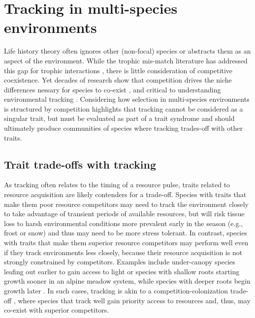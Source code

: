 \documentclass[11pt,letterpaper]{article}
\begin{document}
\section{Tracking in multi-species environments} 
Life history theory often ignores other (non-focal) species or abstracts them as an aspect of the environment. While the trophic mis-match literature has addressed this gap for trophic interactions \citep{Visser:2005bg,vissergienapp2019}, there is little consideration of competitive coexistence. Yet decades of research show that competition drives the niche differences nessary for species to co-exist \citep{Hutchinson:1959xi,Chesson:2000vd}, and critical to understanding environmental tracking \citep{metcalf2015}. Considering how selection in multi-species environments is structured by competition highlights that tracking cannot be considered as a singular trait, but must be evaluated as part of a trait syndrome \citep[or mosaic of traits,][]{Ghalambor2007} and should ultimately produce communities of species where tracking trades-off with other traits.

\subsection{Trait trade-offs with tracking} 

As tracking often relates to the timing of a resource pulse, traits related to resource acquisition are likely contenders for a trade-off. Species with traits that make them poor resource competitors may need to track the environment closely to take advantage of transient periods of available resources, but will risk tissue loss to harsh environmental conditions more prevalent early in the season (e.g., frost or snow) and thus may need to be more stress tolerant. In contrast, species with traits that make them superior resource competitors may perform well even if they track environments less closely, because their resource acquisition is not strongly constrained by competitors. Examples include under-canopy species leafing out earlier to gain access to light \citep{heberling2019} or species with shallow roots starting growth sooner in an alpine meadow system, while species with deeper roots begin growth later \citep{Zhu2016BioLetters}. In such cases, tracking is akin to a competition-colonization trade-off \citep{Amarasekare:2003tq}, where species that track well gain priority access to resources and, thus, may co-exist with superior competitors. 

\end{document}
